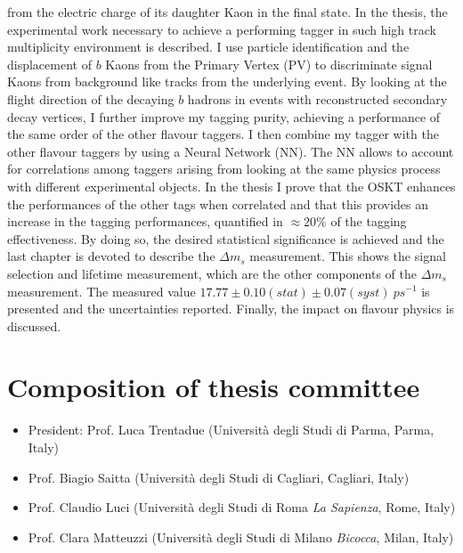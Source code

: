 \documentclass{article}
\begin{document}
\begin{vita}
from the electric charge of its daughter Kaon in the final state. In the thesis, the experimental 
work necessary to achieve a performing tagger in such high track multiplicity environment is 
described. I use particle identification and the displacement of $b$ Kaons from the Primary
Vertex (PV) to discriminate signal Kaons from background like tracks from the underlying event. 
By looking at the flight direction of the decaying $b$ hadrons in events with reconstructed secondary 
decay vertices, I further improve my tagging purity, achieving a performance of the same 
order of the other flavour taggers. I then combine my tagger with the other
 flavour taggers by using a Neural Network (NN). The NN allows to account for correlations
among taggers arising from looking at the same physics process with different 
experimental objects. In the thesis I prove that the OSKT enhances
the performances of the other tags when correlated and that this provides an   
increase in the tagging performances, quantified in $\approx 20\%$ of the 
tagging effectiveness. By doing so, the desired statistical significance
 is achieved and the last chapter is devoted to describe the $\Delta m_{s}$ measurement.
This shows the signal selection and lifetime measurement, which are the other components
of the $\Delta m_{s}$ measurement. The measured value $17.77 \pm 0.10 (stat) \pm 0.07 (syst)~ps^{-1}$
is presented and the uncertainties reported. Finally, the impact on flavour physics is discussed.  

\section*{Composition of thesis committee}
\begin{itemize}
\item President: Prof. Luca Trentadue (Universit\`a degli Studi di Parma, Parma, Italy)
\item Prof. Biagio Saitta (Universit\`a degli Studi di Cagliari, Cagliari, Italy)
\item Prof. Claudio Luci (Universit\`a degli Studi di Roma {\em La Sapienza}, Rome, Italy)
\item Prof. Clara Matteuzzi (Universit\`a degli Studi di Milano {\em Bicocca}, Milan, Italy)
\end{itemize}



\end{vita}


%

\end{document}
